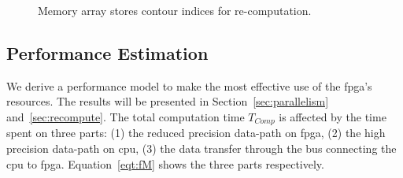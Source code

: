 \setcounter{subfigure}{0}
\begin{figure}[t!]
\centering
{}
\caption{Memory array stores contour indices for re-computation.}
\label{fig:memory}
\end{figure}

\subsection{Performance Estimation}
\label{sec:model}

We derive a performance model to make the most effective use of the \gls{fpga}'s resources.
The results will be presented in Section~\ref{sec:parallelism} and~\ref{sec:recompute}.
The total computation time $T_{Comp}$ is affected by the time spent on three parts:
(1) the reduced precision data-path on \gls{fpga},
(2) the high precision data-path on \gls{cpu},
(3) the data transfer through the bus connecting the \gls{cpu} to \gls{fpga}.
Equation~\ref{eqt:fM} shows the three parts respectively.

